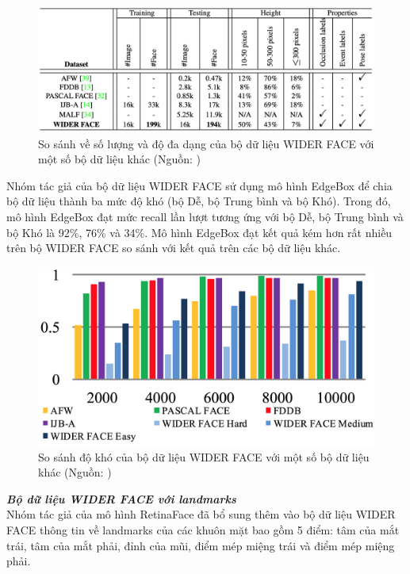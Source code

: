 {    \begin{figure}[H]
        \centering
        \includegraphics[width=15cm] {images/widerface_compare_1}
        \caption{So sánh về số lượng và độ đa dạng của bộ dữ liệu WIDER FACE với một số bộ dữ liệu khác (Nguồn: \cite{yang2016wider})}
        \label{fig:widerface_compare_1}
    \end{figure}
    
    \noindent
    Nhóm tác giả của bộ dữ liệu WIDER FACE sử dụng mô hình EdgeBox \cite{zitnick2014edge} để chia bộ dữ liệu thành ba mức độ khó (bộ Dễ, bộ Trung bình và bộ Khó).
    Trong đó, mô hình EdgeBox đạt mức recall lần lượt tương ứng với bộ Dễ, bộ Trung bình và bộ Khó là 92\%, 76\% và 34\%.
    Mô hình EdgeBox đạt kết quả kém hơn rất nhiều trên bộ WIDER FACE so sánh với kết quả trên các bộ dữ liệu khác.

    \begin{figure}[H]
        \centering
        \includegraphics[width=15cm] {images/widerface_compare_2}
        \caption{So sánh độ khó của bộ dữ liệu WIDER FACE với một số bộ dữ liệu khác (Nguồn: \cite{yang2016wider})}
        \label{fig:widerface_compare_2}
    \end{figure}

    \noindent
    \textbf{\textit{Bộ dữ liệu WIDER FACE với landmarks}} \\
    Nhóm tác giả của mô hình RetinaFace \cite{deng2020retinaface} đã bổ sung thêm vào bộ dữ liệu WIDER FACE thông tin về landmarks của các khuôn mặt bao gồm 5 điểm: tâm của mắt trái, tâm của mắt phải, đỉnh của mũi, điểm mép miệng trái và điểm mép miệng phải.

}
